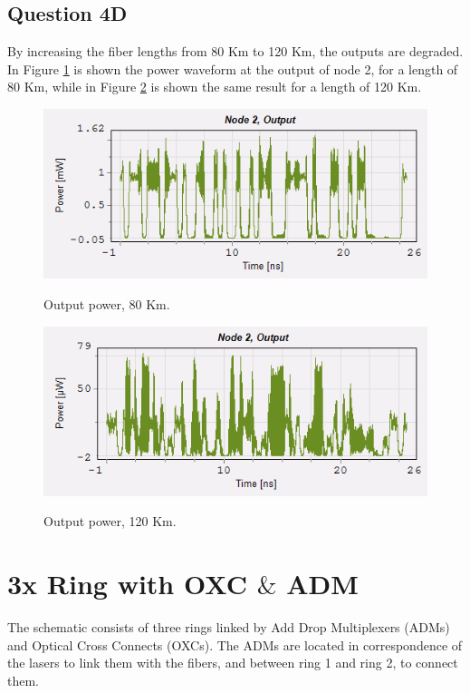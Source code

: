 \documentclass[a4paper,10pt]{report}
\begin{document}
\subsection*{Question 4D}
By increasing the fiber lengths from 80 Km to 120 Km, the outputs are degraded.
In Figure \ref{q4d_1} is shown the power waveform at the output of node 2, for a length of 80 Km,
while in Figure \ref{q4d_2} is shown the same result for a length of 120 Km.

\begin{figure}[!ht]
   \centering
   \includegraphics[width=12cm]{q4d_1.png}\\
   \caption{Output power, 80 Km.}
   \label{q4d_1}
\end{figure}


\begin{figure}[!ht]
   \centering
   \includegraphics[width=12cm]{q4d_2.png}\\
   \caption{Output power, 120 Km.}
   \label{q4d_2}
\end{figure}


\newpage
\section*{3x Ring with OXC $\&$ ADM}
The schematic consists of three rings linked by Add Drop Multiplexers (ADMs) and Optical Cross Connects (OXCs).
The ADMs are located in correspondence of the lasers to link them with the fibers, and between ring 1 and ring 2, to connect them.
\end{document}
